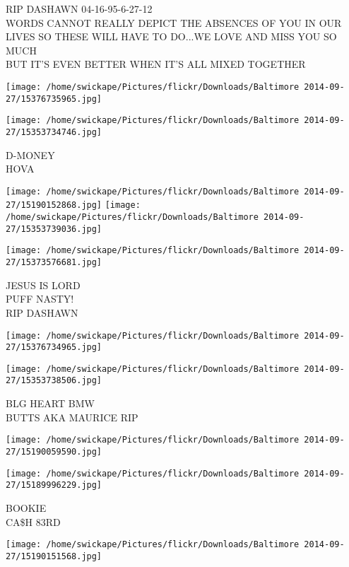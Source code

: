 \documentclass[10pt,letterpaper]{article}
\begin{document}
RIP DASHAWN 04{-}16{-}95{-}6{-}27{-}12\\
WORDS CANNOT REALLY DEPICT THE ABSENCES OF YOU IN OUR LIVES SO THESE WILL HAVE TO DO...WE LOVE AND MISS YOU SO MUCH\\
BUT IT'S EVEN BETTER WHEN IT'S ALL MIXED TOGETHER
\pagebreak

\texttt{[image: /home/swickape/Pictures/flickr/Downloads/Baltimore 2014-09-27/15376735965.jpg]}

\vspace{0.25in}
\texttt{[image: /home/swickape/Pictures/flickr/Downloads/Baltimore 2014-09-27/15353734746.jpg]}

D{-}MONEY\\
HOVA
\pagebreak

\texttt{[image: /home/swickape/Pictures/flickr/Downloads/Baltimore 2014-09-27/15190152868.jpg]}
\texttt{[image: /home/swickape/Pictures/flickr/Downloads/Baltimore 2014-09-27/15353739036.jpg]}

\vspace{0.25in}
\texttt{[image: /home/swickape/Pictures/flickr/Downloads/Baltimore 2014-09-27/15373576681.jpg]}

JESUS IS LORD\\
PUFF NASTY!\\
RIP DASHAWN
\pagebreak

\texttt{[image: /home/swickape/Pictures/flickr/Downloads/Baltimore 2014-09-27/15376734965.jpg]}

\vspace{0.25in}
\texttt{[image: /home/swickape/Pictures/flickr/Downloads/Baltimore 2014-09-27/15353738506.jpg]}

BLG HEART BMW\\
BUTTS AKA MAURICE RIP
\pagebreak

\texttt{[image: /home/swickape/Pictures/flickr/Downloads/Baltimore 2014-09-27/15190059590.jpg]}

\vspace{0.25in}
\texttt{[image: /home/swickape/Pictures/flickr/Downloads/Baltimore 2014-09-27/15189996229.jpg]}

BOOKIE\\
CA\$H 83RD
\pagebreak

\texttt{[image: /home/swickape/Pictures/flickr/Downloads/Baltimore 2014-09-27/15190151568.jpg]}
\end{document}
